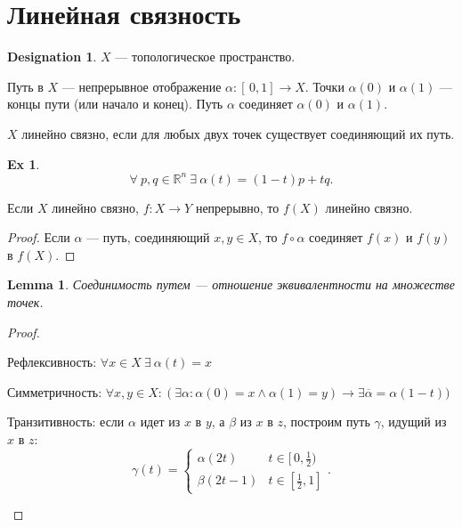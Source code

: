 \documentclass[11pt]{book}
\newcommand{\R}{\mathbb{R}}
\theoremstyle{definition}
\theoremstyle{plain}
\theoremstyle{plain}
\newtheorem*{lm}{Lemma}
\theoremstyle{definition}
\newtheorem*{ex}{Ex}
\newtheorem*{name}{Designation}
\theoremstyle{remark}
\begin{document}
\section{Линейная связность}
\begin{name}
    $ X$ --- топологическое пространство.
\end{name}
\begin{defn}
    Путь в $ X$ --- непрерывное отображение  $ \alpha : [\,0, 1] \to  X$. Точки $ \alpha (0)$ и $ \alpha (1)$ --- концы пути (или начало и конец).
    Путь $ \alpha  $ {\sf соединяет} $ \alpha (0)$ и $ \alpha (1)$.
\end{defn}
\begin{defn}
    $ X$ {\sf линейно связно}, если для любых двух точек существует соединяющий их путь.
\end{defn}
\begin{ex}
    \[
	\forall~ p, q \in  \R^{n} ~ \exists ~ \alpha (t) = (1-t)p + tq
    .\]
\end{ex}
\begin{thm}
    Если $ X$ линейно связно,  $ f: X \to  Y$ непрерывно, то $ f(X)$ линейно связно.
\end{thm}
\begin{proof}
    Если $ \alpha $ ---  путь, соединяющий $ x, y \in  X$, то $ f \circ \alpha $ соединяет $ f(x)$ и $ f(y)$ в $ f(X)$.
\end{proof}
\begin{lm}
    Соединимость путем --- отношение эквивалентности на множестве точек.
\end{lm}
\begin{proof}
    $ $
    \begin{description}
	\item Рефлексивность: $ \forall x \in  X ~ \exists ~ \alpha (t) = x$
	\item Симметричность: $ \forall x, y \in X: (\exists \alpha : \alpha (0) = x \wedge \alpha (1) = y) \to \exists \overline{ \alpha } = \alpha (1-t))$
	\item Транзитивность: если $ \alpha $ идет из $ x$ в $ y$, а  $ \beta $ из $ x$ в  $ z$, построим путь  $ \gamma$, идущий из  $ x$ в $ z$:
	    \[
		\gamma(t) =
		\begin{cases}
		    \alpha (2t) & t \in [\,0,\frac{1}{2}) \\
		    \beta (2t - 1) & t \in  [\frac{1}{2}, 1]
		\end{cases}
	    .\]
    \end{description}
\end{proof}
\end{document}
